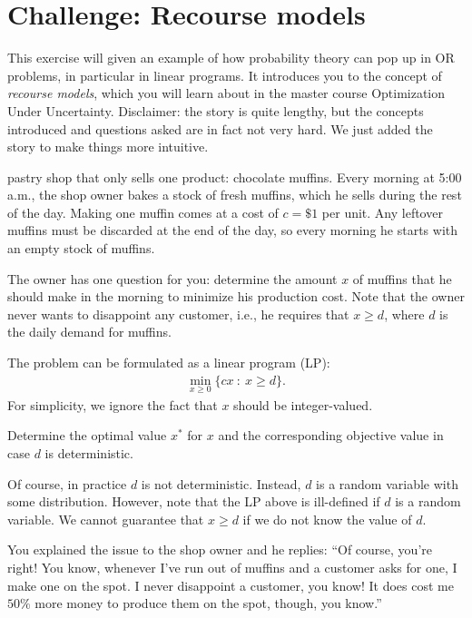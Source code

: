 \section{Challenge: Recourse models}


This exercise will given an example of how probability theory can pop up in OR problems, in particular in linear programs. It introduces you to the concept of \textit{recourse models}, which you will learn about in the master course Optimization Under Uncertainty. Disclaimer: the story is quite lengthy, but the concepts introduced and questions asked are in fact not very hard. We just added the story to make things more intuitive.

 pastry shop that only sells one product: chocolate muffins.
Every morning at 5:00 a.m., the shop owner bakes a stock of fresh muffins, which he sells during the rest of the day.
Making one muffin comes at a cost of $c = \$ 1$ per unit.
Any leftover muffins must be discarded at the end of the day, so every morning he starts with an empty stock of muffins.

The owner has one question for you: determine the amount $x$ of muffins that he should make in the morning to minimize his production cost. Note that the owner never wants to disappoint any customer, i.e., he requires that $x \geq d$, where $d$ is the daily demand for muffins.

The problem can be formulated as a linear program (LP):
\begin{align}
    \min_{x \geq 0} \{ cx \ : \ x \geq d \}.
\end{align}
For simplicity, we ignore the fact that $x$ should be integer-valued.

\begin{exercise}
Determine the optimal value $x^*$ for $x$ and the corresponding objective value in case $d$ is deterministic.
\end{exercise}

Of course, in practice $d$ is not deterministic. Instead, $d$ is a random variable with some distribution. However, note that the LP above is ill-defined if $d$ is a random variable. We cannot guarantee that $x \geq d$ if we do not know the value of $d$.

You explained the issue to the shop owner and he replies: ``Of course, you're right! You know, whenever I've run out of muffins and a customer asks for one, I make one on the spot. I never disappoint a customer, you know! It does cost me $50 \%$ more money to produce them on the spot, though, you know.''

